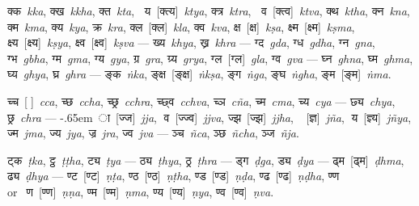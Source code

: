 \documentclass{article}
\newcommand{\siddhanta}[1]{\mbox{\Siddhanta#1}}
\newcommand{\siddhantaII}[1]{\mbox{\SiddhantaII#1}}
\newcommand{\jja}{\siddhanta{{}\kern-.65em{ ा}}}
\newcommand{\lingual}[1]{\textit{#1}}
\newcommand{\siddhantalingual}[2]{\siddhanta{#1}~\lingual{#2}}
\newcommand{\alt}[2]{#1~[#2]}
\newcommand{\siddhantasiddhantalingual}[3]{\alt{\siddhanta{#1}}{\siddhanta{#2}}~\lingual{#3}}
\newcommand{\siddhantaIIsiddhanta}[2]{\alt{\siddhantaII{#1}}{\siddhanta{#2}}}
\newcommand{\siddhantaIIsiddhantalingual}[3]{\siddhantaIIsiddhanta{#1}{#2}~\lingual{#3}}
\begin{document}
\siddhantalingual{क्क}{kka}, \siddhantalingual{क्ख}{kkha}, \siddhantalingual{क्त}{kta}, \siddhantasiddhantalingual{य}{क्त्य}{ktya}, \siddhantalingual{क्त्र}{ktra}, \siddhantasiddhantalingual{व}{क्त्व}{ktva},
\siddhantalingual{क्थ}{ktha}, \siddhantalingual{क्न}{kna}, \siddhantalingual{क्म}{kma}, \siddhantalingual{क्य}{kya}, \siddhantalingual{क्र}{kra}, \siddhantaIIsiddhantalingual{क्ल}{क्ल}{kla}, \siddhantalingual{क्व}{kva},
\siddhantaIIsiddhantalingual{क्ष}{क्ष}{kṣa}, \siddhantaIIsiddhantalingual{क्ष्म}{क्ष्म}{kṣma}, \siddhantaIIsiddhantalingual{क्ष्य}{क्ष्य}{kṣya}, \siddhantaIIsiddhantalingual{क्ष्व}{क्ष्व}{kṣva} --- \siddhantalingual{ख्य}{khya}, \siddhantalingual{ख्र}{khra} ---
\siddhantalingual{ग्द}{gda}, \siddhantalingual{ग्ध}{gdha}, \siddhantalingual{ग्न}{gna}, \siddhantalingual{ग्भ}{gbha}, \siddhantalingual{ग्म}{gma}, \siddhantalingual{ग्य}{gya}, \siddhantalingual{ग्र}{gra},
\siddhantalingual{ग्र्य}{grya}, \siddhantaIIsiddhantalingual{ग्ल}{ग्ल}{gla}, \siddhantalingual{ग्व}{gva} --- \siddhantalingual{घ्न}{ghna}, \siddhantalingual{घ्म}{ghma}, \siddhantalingual{घ्य}{ghya},
\siddhantalingual{घ्र}{ghra} --- \siddhantalingual{ङ्क}{ṅka}, \siddhantaIIsiddhantalingual{ङ्क्ष}{ङ्क्ष}{ṅkṣa}, \siddhantalingual{ङ्ग}{ṅga}, \siddhantalingual{ङ्घ}{ṅgha}, \siddhantaIIsiddhantalingual{ङ्म}{ङ्म}{ṅma}.

\siddhantasiddhantalingual{च्च}{}{cca}, \siddhantalingual{च्छ}{ccha}, \siddhantalingual{च्छ्र}{cchra}, \siddhantalingual{च्छ्व}{cchva}, \siddhantalingual{च्ञ}{cña}, \siddhantalingual{च्म}{cma},
\siddhantalingual{च्य}{cya} --- \siddhantalingual{छ्य}{chya}, \siddhantalingual{छ्र}{chra} --- \siddhantasiddhantalingual{\jja{}}{ज्ज}{jja}, \siddhantasiddhantalingual{व}{ज्ज्व}{jjva}, \siddhantaIIsiddhantalingual{ज्झ}{ज्झ}{jjha},
\siddhantasiddhantalingual{}{ज्ञ}{jña}, \siddhantaIIsiddhantalingual{य}{ज्ञ्य}{jñya}, \siddhantalingual{ज्म}{jma}, \siddhantalingual{ज्य}{jya}, \siddhantalingual{ज्र}{jra}, \siddhantalingual{ज्व}{jva} --- \siddhantalingual{ञ्च}{ñca},
\siddhantalingual{ञ्छ}{ñcha}, \siddhantalingual{ञ्ज}{ñja}.

\siddhantalingual{ट्क}{ṭka}, \siddhantalingual{ट्ठ}{ṭṭha}, \siddhantalingual{ट्य}{ṭya} --- \siddhantalingual{ठ्य}{ṭhya}, \siddhantalingual{ठ्र}{ṭhra} --- \siddhantalingual{ड्ग}{ḍga},
\siddhantalingual{ड्य}{ḍya} --- \siddhantaIIsiddhantalingual{ढ्म}{ढ्म}{ḍhma}, \siddhantalingual{ढ्य}{ḍhya} --- \siddhantaIIsiddhantalingual{ण्ट}{ण्ट}{ṇṭa}, \siddhantaIIsiddhantalingual{ण्ठ}{ण्ठ}{ṇṭha}, \siddhantaIIsiddhantalingual{ण्ड}{ण्ड}{ṇḍa},
\siddhantaIIsiddhantalingual{ण्ढ}{ण्ढ}{ṇḍha}, \siddhantaII{ण्ण} or~\siddhantaIIsiddhantalingual{ण}{ण्ण}{ṇṇa}, \siddhantaIIsiddhantalingual{ण्म}{ण्म}{ṇma}, \siddhantaIIsiddhantalingual{ण्य}{ण्य}{ṇya}, \siddhantaIIsiddhantalingual{ण्व}{ण्व}{ṇva}.
\end{document}
